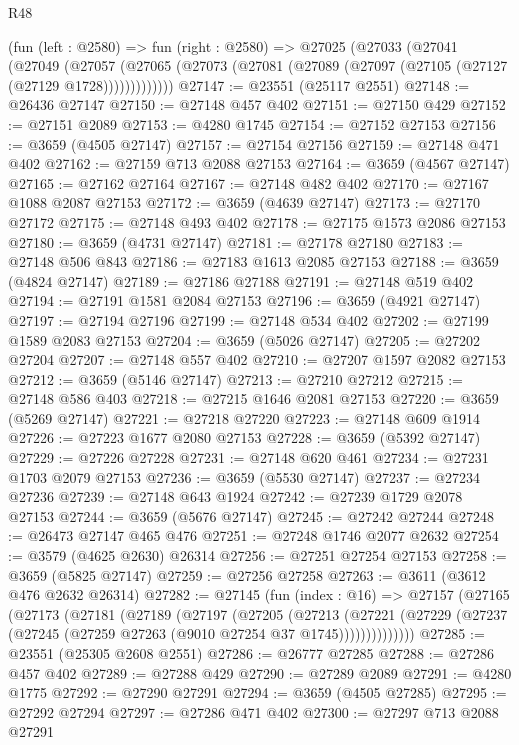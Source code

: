 \begin{lexlean}{R48}
\begin{coremodule}
    (fun (left : @2580) =>
    fun (right : @2580) =>
    @27025
      (@27033
        (@27041
          (@27049
            (@27057
              (@27065 (@27073 (@27081 (@27089 (@27097 (@27105 (@27127 (@27129 @1728)))))))))))))
@27147 := @23551 (@25117 @2551)
@27148 := @26436 @27147
@27150 := @27148 @457 @402
@27151 := @27150 @429
@27152 := @27151 @2089
@27153 := @4280 @1745
@27154 := @27152 @27153
@27156 := @3659 (@4505 @27147)
@27157 := @27154 @27156
@27159 := @27148 @471 @402
@27162 := @27159 @713 @2088 @27153
@27164 := @3659 (@4567 @27147)
@27165 := @27162 @27164
@27167 := @27148 @482 @402
@27170 := @27167 @1088 @2087 @27153
@27172 := @3659 (@4639 @27147)
@27173 := @27170 @27172
@27175 := @27148 @493 @402
@27178 := @27175 @1573 @2086 @27153
@27180 := @3659 (@4731 @27147)
@27181 := @27178 @27180
@27183 := @27148 @506 @843
@27186 := @27183 @1613 @2085 @27153
@27188 := @3659 (@4824 @27147)
@27189 := @27186 @27188
@27191 := @27148 @519 @402
@27194 := @27191 @1581 @2084 @27153
@27196 := @3659 (@4921 @27147)
@27197 := @27194 @27196
@27199 := @27148 @534 @402
@27202 := @27199 @1589 @2083 @27153
@27204 := @3659 (@5026 @27147)
@27205 := @27202 @27204
@27207 := @27148 @557 @402
@27210 := @27207 @1597 @2082 @27153
@27212 := @3659 (@5146 @27147)
@27213 := @27210 @27212
@27215 := @27148 @586 @403
@27218 := @27215 @1646 @2081 @27153
@27220 := @3659 (@5269 @27147)
@27221 := @27218 @27220
@27223 := @27148 @609 @1914
@27226 := @27223 @1677 @2080 @27153
@27228 := @3659 (@5392 @27147)
@27229 := @27226 @27228
@27231 := @27148 @620 @461
@27234 := @27231 @1703 @2079 @27153
@27236 := @3659 (@5530 @27147)
@27237 := @27234 @27236
@27239 := @27148 @643 @1924
@27242 := @27239 @1729 @2078 @27153
@27244 := @3659 (@5676 @27147)
@27245 := @27242 @27244
@27248 := @26473 @27147 @465 @476
@27251 := @27248 @1746 @2077 @2632
@27254 := @3579 (@4625 @2630) @26314
@27256 := @27251 @27254 @27153
@27258 := @3659 (@5825 @27147)
@27259 := @27256 @27258
@27263 := @3611 (@3612 @476 @2632 @26314)
@27282 := @27145
    (fun (index : @16) =>
    @27157
      (@27165
        (@27173
          (@27181
            (@27189
              (@27197
                (@27205
                  (@27213
                    (@27221
                      (@27229 (@27237 (@27245 (@27259 @27263 (@9010 @27254 @37 @1745))))))))))))))
@27285 := @23551 (@25305 @2608 @2551)
@27286 := @26777 @27285
@27288 := @27286 @457 @402
@27289 := @27288 @429
@27290 := @27289 @2089
@27291 := @4280 @1775
@27292 := @27290 @27291
@27294 := @3659 (@4505 @27285)
@27295 := @27292 @27294
@27297 := @27286 @471 @402
@27300 := @27297 @713 @2088 @27291

\end{coremodule}
\end{lexlean}
